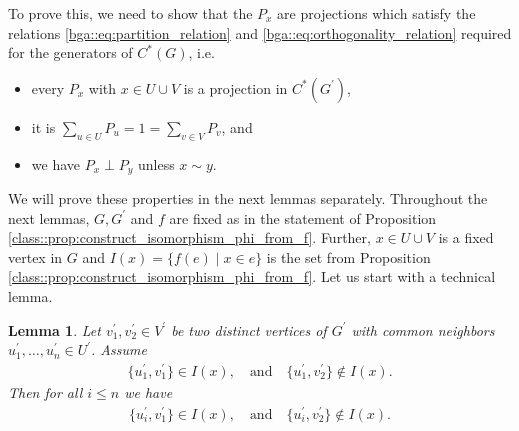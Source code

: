 \documentclass[a4paper]{amsart}
\newtheorem{lemma}[thm]{Lemma}
\begin{document}
To prove this, we need to show that the $P_x$ are projections which satisfy the relations \eqref{bga::eq:partition_relation} and \eqref{bga::eq:orthogonality_relation} required for the generators of $C^\ast(G)$, i.e.
\begin{itemize}
    \item every $P_x$ with $x \in U \cup V$ is a projection  in $C^\ast(G^\prime)$,
    \item it is $\sum_{u \in U} P_u = 1 = \sum_{v \in V} P_v$, and
    \item we have $P_x \perp P_y$ unless $x \sim y$.
\end{itemize}
We will prove these properties in the next lemmas separately. Throughout the next lemmas, $G, G^\prime$ and $f$ are fixed as in the statement of Proposition \ref{class::prop:construct_isomorphism_phi_from_f}. Further, $x \in U \cup V$ is a fixed vertex in $G$ and $I(x) = \{f(e) \mid x \in e\}$ is the set from Proposition \ref{class::prop:construct_isomorphism_phi_from_f}. Let us start with a technical lemma.

\begin{lemma} 
    \label{class::lemma:properties_of_I(x)}
    Let $v_1^\prime, v_2^\prime \in V^\prime$ be two distinct vertices of $G^\prime$ with common neighbors $u_1^\prime, \dots, u_n^\prime \in U^\prime$. Assume
    \begin{align*}
        \{u_1^\prime, v_1^\prime\} \in I(x),
        \quad \text{and} \quad 
        \{u_1^\prime, v_2^\prime\} \not \in I(x).
    \end{align*}
    Then for all $i \leq n$ we have
    \begin{align*}
        \{u_i^\prime, v_1^\prime\} \in I(x),
        \quad \text{and} \quad 
        \{u_i^\prime, v_2^\prime\} \not \in I(x).
    \end{align*}
\end{lemma}
\end{document}
